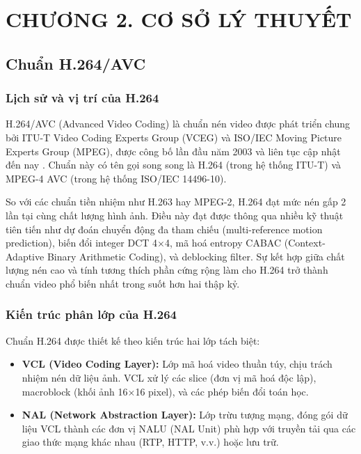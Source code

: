 \clearpage
{}
\section*{CHƯƠNG 2. CƠ SỞ LÝ THUYẾT}
\setcounter{section}{2}
\setcounter{subsection}{0}
\setcounter{figure}{0}
\setcounter{table}{0}
\setcounter{equation}{0}

\subsection{Chuẩn H.264/AVC}

\subsubsection{Lịch sử và vị trí của H.264}

H.264/AVC (Advanced Video Coding) là chuẩn nén video được phát triển chung bởi
ITU-T Video Coding Experts Group (VCEG) và ISO/IEC Moving Picture Experts Group (MPEG),
được công bố lần đầu năm 2003 và liên tục cập nhật đến nay \cite{itu_h264}.
Chuẩn này có tên gọi song song là H.264 (trong hệ thống ITU-T) và MPEG-4 AVC
(trong hệ thống ISO/IEC 14496-10).

So với các chuẩn tiền nhiệm như H.263 hay MPEG-2, H.264 đạt mức nén gấp 2 lần
tại cùng chất lượng hình ảnh. Điều này đạt được thông qua nhiều kỹ thuật tiên tiến
như dự đoán chuyển động đa tham chiếu (multi-reference motion prediction), biến đổi
integer DCT 4$\times$4, mã hoá entropy CABAC (Context-Adaptive Binary Arithmetic Coding),
và deblocking filter. Sự kết hợp giữa chất lượng nén cao và tính tương thích phần cứng
rộng làm cho H.264 trở thành chuẩn video phổ biến nhất trong suốt hơn hai thập kỷ.

\subsubsection{Kiến trúc phân lớp của H.264}

Chuẩn H.264 được thiết kế theo kiến trúc hai lớp tách biệt:

\begin{itemize}
  \item \textbf{VCL (Video Coding Layer):} Lớp mã hoá video thuần túy, chịu trách
        nhiệm nén dữ liệu ảnh. VCL xử lý các slice (đơn vị mã hoá độc lập),
        macroblock (khối ảnh 16$\times$16 pixel), và các phép biến đổi toán học.

  \item \textbf{NAL (Network Abstraction Layer):} Lớp trừu tượng mạng, đóng gói
        dữ liệu VCL thành các đơn vị NALU (NAL Unit) phù hợp với truyền tải
        qua các giao thức mạng khác nhau (RTP, HTTP, v.v.) hoặc lưu trữ.
\end{itemize}

